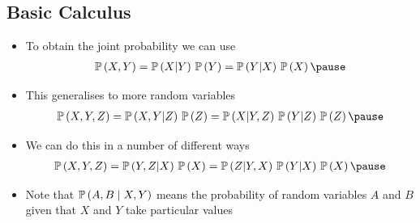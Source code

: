 
\begin{slide}
\section{Basic Calculus}

\begin{PauseHighLight}
  \begin{itemize}
  \item To obtain the joint probability we can use
    \begin{align*}
      \Prob{X,Y} = \Prob{X|Y}\,\Prob{Y} = \Prob{Y|X}\,\Prob{X}\pause
    \end{align*}
  \item This generalises to more random variables
    \begin{align*}
      \Prob{X,Y,Z} = \Prob{X,Y|Z}\, \Prob{Z}
      = \Prob{X|Y,Z}\,\Prob{Y|Z}\,\Prob{Z}\pause
    \end{align*}
  \item We can do this in a number of different ways
    \begin{align*}
      \Prob{X,Y,Z} = \Prob{Y,Z|X}\, \Prob{X}
      = \Prob{Z|Y,X}\,\Prob{Y|X}\,\Prob{X}\pause
    \end{align*}
    \item Note that $\mathbb{P}\left( A,B \mid X,Y \right)$ means the probability of
      random variables $A$ and $B$ given that $X$ and $Y$ take
      particular values\pause
  \end{itemize}
\end{PauseHighLight}

\end{slide}



